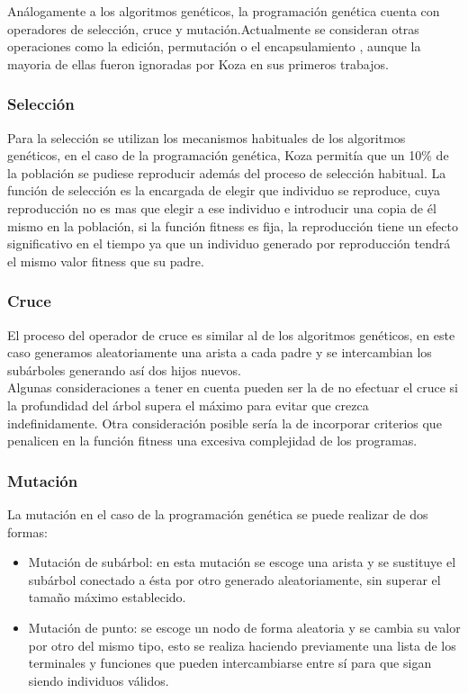 \documentclass[12pt]{article} \usepackage[utf8x]{inputenc}
\begin{document}
Análogamente a los algoritmos genéticos, la programación genética
cuenta con operadores de selección, cruce y mutación.Actualmente se
consideran otras operaciones como la edición, permutación o el
encapsulamiento , aunque la mayoria de ellas fueron ignoradas por Koza
en sus primeros trabajos.

\subsubsection{Selección}

Para la selección se utilizan los mecanismos habituales de los
algoritmos genéticos, en el caso de la programación genética, Koza
permitía que un 10\% de la población se pudiese reproducir además del
proceso de selección habitual. La función de selección es la encargada
de elegir que individuo se reproduce, cuya reproducción no es mas que
elegir a ese individuo e introducir una copia de él mismo en la
población, si la función fitness es fija, la reproducción tiene un
efecto significativo en el tiempo ya que un individuo generado por
reproducción tendrá el mismo valor fitness que su padre.

\subsubsection{Cruce}

El proceso del operador de cruce es similar al de los algoritmos genéticos, 
en este caso generamos aleatoriamente una arista a cada padre y se 
intercambian los subárboles generando así dos hijos nuevos.\\

Algunas consideraciones a tener en cuenta pueden ser la de no efectuar
el cruce si la profundidad del árbol supera el máximo para evitar que
crezca indefinidamente. Otra consideración posible sería la de
incorporar criterios que penalicen en la función fitness una excesiva
complejidad de los programas.

\subsubsection{Mutación}

La mutación en el caso de la programación genética se puede realizar
de dos formas:

\begin{itemize}
\item Mutación de subárbol: en esta mutación se escoge una arista y se
  sustituye el subárbol conectado a ésta por otro generado
  aleatoriamente, sin superar el tamaño máximo establecido.
\item Mutación de punto: se escoge un nodo de forma aleatoria y se
  cambia su valor por otro del mismo tipo, esto se realiza haciendo
  previamente una lista de los terminales y funciones que pueden
  intercambiarse entre sí para que sigan siendo individuos válidos.
\end{itemize}
\end{document}
